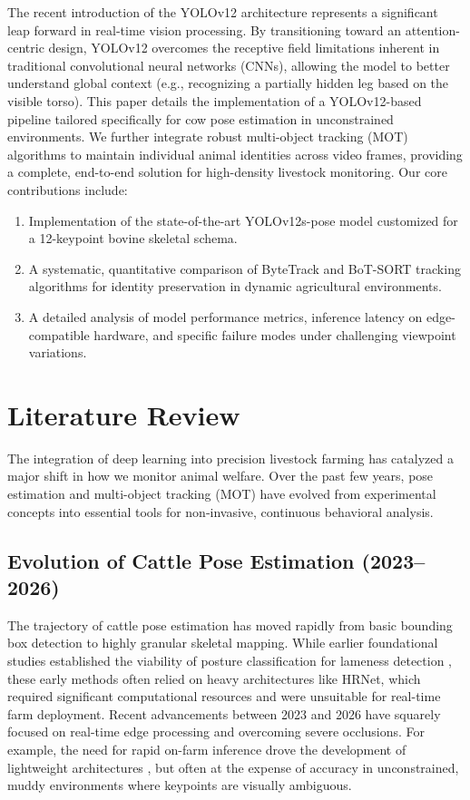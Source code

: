 \documentclass[conference]{IEEEtran}
\begin{document}
The recent introduction of the YOLOv12 architecture represents a significant leap forward in real-time vision processing. By transitioning toward an attention-centric design, YOLOv12 overcomes the receptive field limitations inherent in traditional convolutional neural networks (CNNs), allowing the model to better understand global context (e.g., recognizing a partially hidden leg based on the visible torso). This paper details the implementation of a YOLOv12-based pipeline tailored specifically for cow pose estimation in unconstrained environments. We further integrate robust multi-object tracking (MOT) algorithms to maintain individual animal identities across video frames, providing a complete, end-to-end solution for high-density livestock monitoring. Our core contributions include:
\begin{enumerate}
    \item Implementation of the state-of-the-art YOLOv12s-pose model customized for a 12-keypoint bovine skeletal schema.
    \item A systematic, quantitative comparison of ByteTrack and BoT-SORT tracking algorithms for identity preservation in dynamic agricultural environments.
    \item A detailed analysis of model performance metrics, inference latency on edge-compatible hardware, and specific failure modes under challenging viewpoint variations.
\end{enumerate}

\section{Literature Review}
The integration of deep learning into precision livestock farming has catalyzed a major shift in how we monitor animal welfare. Over the past few years, pose estimation and multi-object tracking (MOT) have evolved from experimental concepts into essential tools for non-invasive, continuous behavioral analysis.

\subsection{Evolution of Cattle Pose Estimation (2023--2026)}
The trajectory of cattle pose estimation has moved rapidly from basic bounding box detection to highly granular skeletal mapping. While earlier foundational studies established the viability of posture classification for lameness detection \cite{russell2018cattle, wu2021cow}, these early methods often relied on heavy architectures like HRNet, which required significant computational resources and were unsuitable for real-time farm deployment. Recent advancements between 2023 and 2026 have squarely focused on real-time edge processing and overcoming severe occlusions. For example, the need for rapid on-farm inference drove the development of lightweight architectures \cite{li2022lightweight}, but often at the expense of accuracy in unconstrained, muddy environments where keypoints are visually ambiguous.
\end{document}
